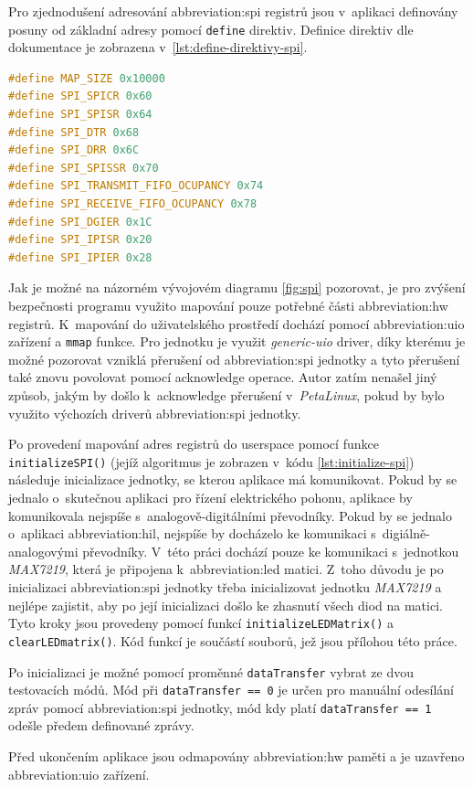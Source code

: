 \documentclass[a4paper, twoside, 11pt]{article}
\newcommand{\fbar}{\FloatBarrier}
\begin{document}
	Pro zjednodušení adresování \gls{abbreviation:spi} registrů jsou v~aplikaci definovány posuny od základní adresy pomocí \texttt{define} direktiv. Definice direktiv dle dokumentace \cite{axi-quad-spi-ip-product-guide} je zobrazena v~\ref{lst:define-direktivy-spi}.\par

	\fbar
	\begin{lstlisting}[language={c++}, caption={Definice posuvu adres pro registry \gls{abbreviation:axi} Quad \gls{abbreviation:spi} bloku pomocí define direktiv.}, label={lst:define-direktivy-spi}]
#define MAP_SIZE 0x10000
#define SPI_SPICR 0x60
#define SPI_SPISR 0x64
#define SPI_DTR 0x68
#define SPI_DRR 0x6C
#define SPI_SPISSR 0x70
#define SPI_TRANSMIT_FIFO_OCUPANCY 0x74
#define SPI_RECEIVE_FIFO_OCUPANCY 0x78
#define SPI_DGIER 0x1C
#define SPI_IPISR 0x20
#define SPI_IPIER 0x28\end{lstlisting}

	Jak je možné na názorném vývojovém diagramu \ref{fig:spi} pozorovat, je pro zvýšení bezpečnosti programu využito mapování pouze potřebné části \gls{abbreviation:hw} registrů. K~mapování do uživatelského prostředí dochází pomocí \gls{abbreviation:uio} zařízení a \texttt{mmap} funkce. Pro jednotku je využit \textit{generic-uio} driver, díky kterému je možné pozorovat vzniklá přerušení od \gls{abbreviation:spi} jednotky a tyto přerušení také znovu povolovat pomocí acknowledge operace. Autor zatím nenašel jiný způsob, jakým by došlo k~acknowledge přerušení v~\textit{PetaLinux}, pokud by bylo využito výchozích driverů \gls{abbreviation:spi} jednotky.\par
	Po provedení mapování adres registrů do userspace pomocí funkce \texttt{initializeSPI()} (jejíž algoritmus je zobrazen v~kódu \ref{lst:initialize-spi}) následuje inicializace jednotky, se kterou aplikace má komunikovat. Pokud by se jednalo o~skutečnou aplikaci pro řízení elektrického pohonu, aplikace by komunikovala nejspíše s~analogově-digitálními převodníky. Pokud by se jednalo o~aplikaci \gls{abbreviation:hil}, nejspíše by docházelo ke komunikaci s~digiálně-analogovými převodníky. V~této práci dochází pouze ke komunikaci s~jednotkou \textit{MAX7219}, která je připojena k~\gls{abbreviation:led} matici. Z~toho důvodu je po inicializaci \gls{abbreviation:spi} jednotky třeba inicializovat jednotku \textit{MAX7219} a nejlépe zajistit, aby po její inicializaci došlo ke zhasnutí všech diod na matici. Tyto kroky jsou provedeny pomocí funkcí \texttt{initializeLEDMatrix()} a \texttt{clearLEDmatrix()}. Kód funkcí je součástí souborů, jež jsou přílohou této práce.\par
	Po inicializaci je možné pomocí proměnné \texttt{dataTransfer} vybrat ze dvou testovacích módů. Mód při \texttt{dataTransfer == 0} je určen pro manuální odesílání zpráv pomocí \gls{abbreviation:spi} jednotky, mód kdy platí \texttt{dataTransfer == 1} odešle předem definované zprávy.\par
	Před ukončením aplikace jsou odmapovány \gls{abbreviation:hw} paměti a je uzavřeno \gls{abbreviation:uio} zařízení.
\end{document}
